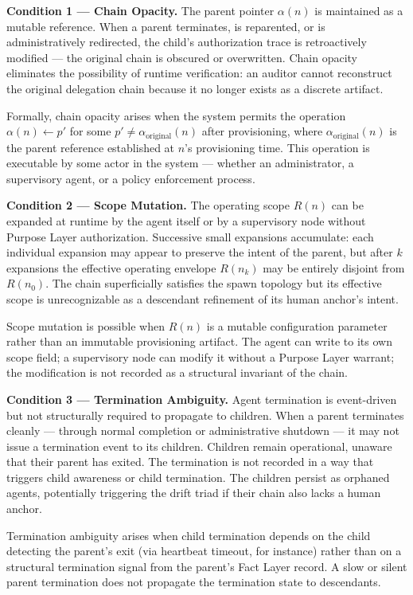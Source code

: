\medskip
\noindent\textbf{Condition 1 — Chain Opacity.} The parent pointer $\alpha(n)$ is maintained as a mutable reference. When a parent terminates, is reparented, or is administratively redirected, the child's authorization trace is retroactively modified — the original chain is obscured or overwritten. Chain opacity eliminates the possibility of runtime verification: an auditor cannot reconstruct the original delegation chain because it no longer exists as a discrete artifact.

Formally, chain opacity arises when the system permits the operation $\alpha(n) \leftarrow p'$ for some $p' \neq \alpha_{\text{original}}(n)$ after provisioning, where $\alpha_{\text{original}}(n)$ is the parent reference established at $n$'s provisioning time. This operation is executable by some actor in the system — whether an administrator, a supervisory agent, or a policy enforcement process.

\medskip
\noindent\textbf{Condition 2 — Scope Mutation.} The operating scope $R(n)$ can be expanded at runtime by the agent itself or by a supervisory node without Purpose Layer authorization. Successive small expansions accumulate: each individual expansion may appear to preserve the intent of the parent, but after $k$ expansions the effective operating envelope $R(n_k)$ may be entirely disjoint from $R(n_0)$. The chain superficially satisfies the spawn topology but its effective scope is unrecognizable as a descendant refinement of its human anchor's intent.

Scope mutation is possible when $R(n)$ is a mutable configuration parameter rather than an immutable provisioning artifact. The agent can write to its own scope field; a supervisory node can modify it without a Purpose Layer warrant; the modification is not recorded as a structural invariant of the chain.

\medskip
\noindent\textbf{Condition 3 — Termination Ambiguity.} Agent termination is event-driven but not structurally required to propagate to children. When a parent terminates cleanly — through normal completion or administrative shutdown — it may not issue a termination event to its children. Children remain operational, unaware that their parent has exited. The termination is not recorded in a way that triggers child awareness or child termination. The children persist as orphaned agents, potentially triggering the drift triad if their chain also lacks a human anchor.

Termination ambiguity arises when child termination depends on the child detecting the parent's exit (via heartbeat timeout, for instance) rather than on a structural termination signal from the parent's Fact Layer record. A slow or silent parent termination does not propagate the termination state to descendants.

